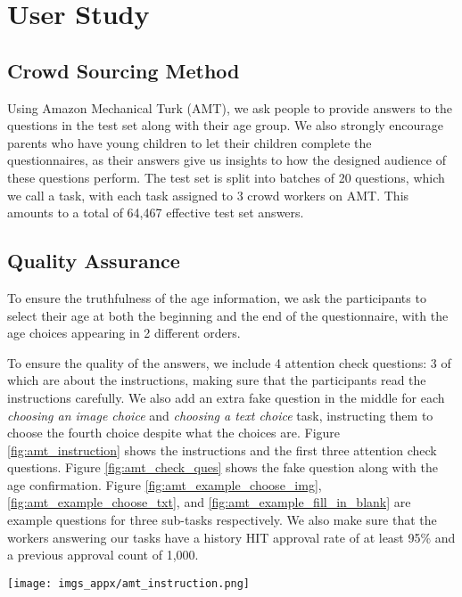 \documentclass{article}
\begin{document}
\section{User Study}
\label{app_user_study}

\subsection{Crowd Sourcing Method}
Using Amazon Mechanical Turk (AMT), we ask people to provide answers to the questions in the test set along with their age group. We also strongly encourage parents who have young children to let their children complete the questionnaires, as their answers give us insights to how the designed audience of these questions perform. The test set is split into batches of 20 questions, which we call a task, with each task assigned to 3 crowd workers on AMT. This amounts to a total of 64,467 effective test set answers.

\subsection{Quality Assurance}

To ensure the truthfulness of the age information, we ask the participants to select their age at both the beginning and the end of the questionnaire, with the age choices appearing in 2 different orders. \par
To ensure the quality of the answers, we include 4 attention check questions: 3 of which are about the instructions, making sure that the participants read the instructions carefully. We also add an extra fake question in the middle for each \textit{choosing an image choice} and \textit{choosing a text choice} task, instructing them to choose the fourth choice despite what the choices are. Figure \ref{fig:amt_instruction} shows the instructions and the first three attention check questions. Figure \ref{fig:amt_check_ques} shows the fake question along with the age confirmation. Figure \ref{fig:amt_example_choose_img}, \ref{fig:amt_example_choose_txt}, and \ref{fig:amt_example_fill_in_blank} are example questions for three sub-tasks respectively. We also make sure that the workers answering our tasks have a history HIT approval rate of at least 95\% and a previous approval count of 1,000. 

\begin{figure*}[t!]
\centering 
    \texttt{[image: imgs\_appx/amt\_instruction.png]}
    \caption{AMT instructions for the user study.}
    \label{fig:amt_instruction}
\end{figure*}
\end{document}
